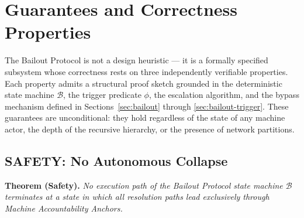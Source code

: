 \section{Guarantees and Correctness Properties}
\label{sec:bailout-guarantees}

The Bailout Protocol is not a design heuristic — it is a formally specified subsystem whose correctness rests on three independently verifiable properties. Each property admits a structural proof sketch grounded in the deterministic state machine $\mathcal{B}$, the trigger predicate $\phi$, the escalation algorithm, and the bypass mechanism defined in Sections~\ref{sec:bailout} through \ref{sec:bailout-trigger}. These guarantees are unconditional: they hold regardless of the state of any machine actor, the depth of the recursive hierarchy, or the presence of network partitions.

\subsection{SAFETY: No Autonomous Collapse}

\textbf{Theorem (Safety).} \emph{No execution path of the Bailout Protocol state machine $\mathcal{B}$ terminates at a state in which all resolution paths lead exclusively through Machine Accountability Anchors.}

